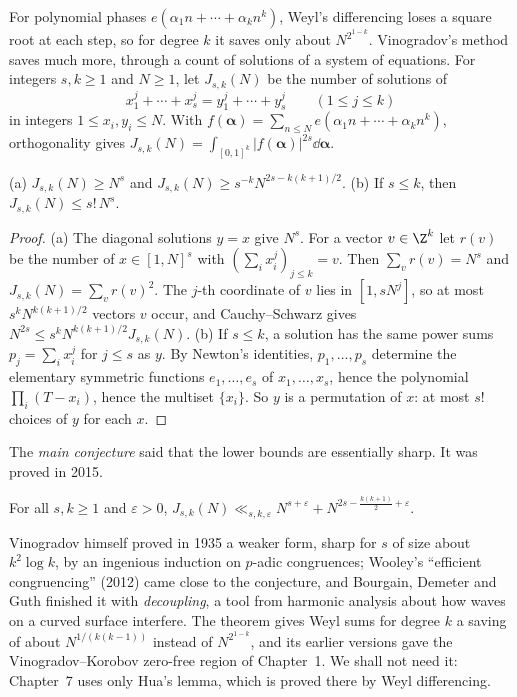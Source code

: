 For polynomial phases $e(\alpha_1n+\cdots+\alpha_kn^k)$, Weyl's differencing loses a square root at each step, so for degree $k$ it saves only about $N^{2^{1-k}}$. Vinogradov's method saves much more, through a count of solutions of a system of equations. For integers $s,k\ge1$ and $N\ge1$, let $J_{s,k}(N)$ be the number of solutions of
\[
x_1^j+\cdots+x_s^j=y_1^j+\cdots+y_s^j\qquad(1\le j\le k)
\]
in integers $1\le x_i,y_i\le N$. With $f(\boldsymbol\alpha)=\sum_{n\le N}e(\alpha_1n+\cdots+\alpha_kn^k)$, orthogonality gives $J_{s,k}(N)=\int_{[0,1]^k}|f(\boldsymbol\alpha)|^{2s}\dd\boldsymbol\alpha$.

\begin{proposition}\label{prop:vmvtbounds}
(a) $J_{s,k}(N)\ge N^s$ and $J_{s,k}(N)\ge s^{-k}N^{2s-k(k+1)/2}$.
(b) If $s\le k$, then $J_{s,k}(N)\le s!\,N^s$.
\end{proposition}
\begin{proof}
(a) The diagonal solutions $y=x$ give $N^s$. For a vector $v\in\Z^k$ let $r(v)$ be the number of $x\in[1,N]^s$ with $(\sum_ix_i^j)_{j\le k}=v$. Then $\sum_vr(v)=N^s$ and $J_{s,k}(N)=\sum_vr(v)^2$. The $j$-th coordinate of $v$ lies in $[1,sN^j]$, so at most $s^kN^{k(k+1)/2}$ vectors $v$ occur, and Cauchy--Schwarz gives $N^{2s}\le s^kN^{k(k+1)/2}J_{s,k}(N)$.
(b) If $s\le k$, a solution has the same power sums $p_j=\sum_ix_i^j$ for $j\le s$ as $y$. By Newton's identities, $p_1,\dots,p_s$ determine the elementary symmetric functions $e_1,\dots,e_s$ of $x_1,\dots,x_s$, hence the polynomial $\prod_i(T-x_i)$, hence the multiset $\{x_i\}$. So $y$ is a permutation of $x$: at most $s!$ choices of $y$ for each $x$.
\end{proof}

The \emph{main conjecture} said that the lower bounds are essentially sharp. It was proved in 2015.

\begin{theorem}[Bourgain, Demeter, Guth; Wooley for $k=3$; quoted]\label{thm:vmvt}
For all $s,k\ge1$ and $\varepsilon>0$, $J_{s,k}(N)\ll_{s,k,\varepsilon}N^{s+\varepsilon}+N^{2s-\frac{k(k+1)}2+\varepsilon}$.
\end{theorem}

Vinogradov himself proved in 1935 a weaker form, sharp for $s$ of size about $k^2\log k$, by an ingenious induction on $p$-adic congruences; Wooley's ``efficient congruencing'' (2012) came close to the conjecture, and Bourgain, Demeter and Guth finished it with \emph{decoupling}, a tool from harmonic analysis about how waves on a curved surface interfere. The theorem gives Weyl sums for degree $k$ a saving of about $N^{1/(k(k-1))}$ instead of $N^{2^{1-k}}$, and its earlier versions gave the Vinogradov--Korobov zero-free region of Chapter~1. We shall not need it: Chapter~7 uses only Hua's lemma, which is proved there by Weyl differencing.

